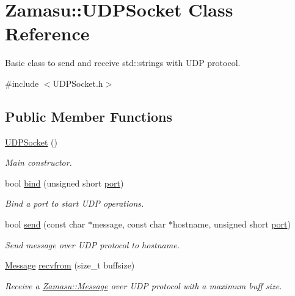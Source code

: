 \hypertarget{class_zamasu_1_1_u_d_p_socket}{}\section{Zamasu\+:\+:U\+D\+P\+Socket Class Reference}
\label{class_zamasu_1_1_u_d_p_socket}


Basic class to send and receive std\+::string\textquotesingle{}s with U\+DP protocol.  




{\ttfamily \#include $<$U\+D\+P\+Socket.\+h$>$}

\subsection*{Public Member Functions}
\begin{DoxyCompactItemize}
\item 
\hyperlink{class_zamasu_1_1_u_d_p_socket_a4f86f3023f5a08f6355802599a10e100}{U\+D\+P\+Socket} ()
\begin{DoxyCompactList}\small\item\em Main constructor. \end{DoxyCompactList}\item 
bool \hyperlink{class_zamasu_1_1_u_d_p_socket_a48efbc523caa87eeb60b4c35f807cd3c}{bind} (unsigned short \hyperlink{class_zamasu_1_1_u_d_p_socket_ad03f2d80351b790709530b19a7b5d82f}{port})
\begin{DoxyCompactList}\small\item\em Bind a port to start U\+DP operations. \end{DoxyCompactList}\item 
bool \hyperlink{class_zamasu_1_1_u_d_p_socket_ab015aae73f299251c990a4124840f5b3}{send} (const char $\ast$message, const char $\ast$hostname, unsigned short \hyperlink{class_zamasu_1_1_u_d_p_socket_ad03f2d80351b790709530b19a7b5d82f}{port})
\begin{DoxyCompactList}\small\item\em Send message over U\+DP protocol to hostname. \end{DoxyCompactList}\item 
\hyperlink{class_zamasu_1_1_message}{Message} \hyperlink{class_zamasu_1_1_u_d_p_socket_a06464136e5da6aeaa2e3433d609502fb}{recvfrom} (size\+\_\+t buffsize)
\begin{DoxyCompactList}\small\item\em Receive a \hyperlink{class_zamasu_1_1_message}{Zamasu\+::\+Message} over U\+DP protocol with a maximum buff size. \end{DoxyCompactList}\end{DoxyCompactItemize}
